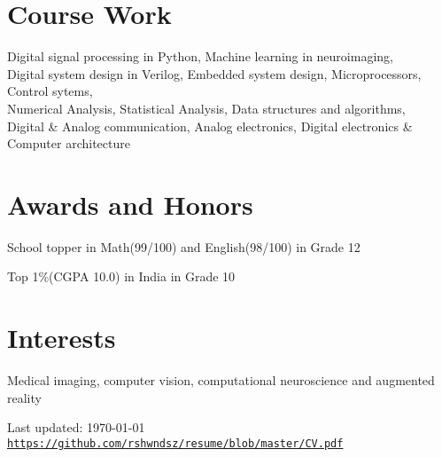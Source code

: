 \documentclass[letterpaper]{article}
\def\footerlink{https://github.com/rshwndsz/resume/blob/master/CV.pdf}
\renewenvironment{itemize}{
  \begin{list}{}{
    \setlength{\leftmargin}{1.5em}
  }
}{
  \end{list}
}
\begin{document}


\section*{Course Work}
  \begin{itemize}
    \item  Digital signal processing in Python, Machine learning in neuroimaging, \\
    Digital system design in Verilog, Embedded system design,
    Microprocessors, Control sytems,\\
    Numerical Analysis, Statistical Analysis, Data structures and algorithms, \\
    Digital \& Analog communication, Analog electronics, Digital electronics \& Computer architecture
  \end{itemize}


\section*{Awards and Honors}
\begin{itemize}
  \item School topper in Math(99/100) and English(98/100) in Grade 12
  \item Top 1\%(CGPA 10.0) in India in Grade 10
\end{itemize}


\section*{Interests}
  \begin{itemize}
    \item Medical imaging, computer vision, computational neuroscience and augmented reality
  \end{itemize}


\bigskip
\begin{center}
  \begin{footnotesize}
    Last updated: \today \\
    \href{\footerlink}{\texttt{\footerlink}}
  \end{footnotesize}
\end{center}
\end{document}
